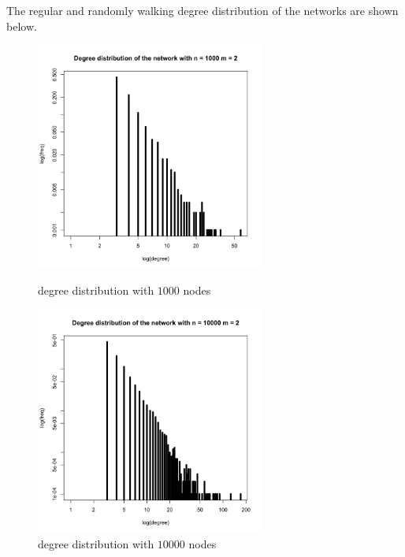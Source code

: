 \documentclass[draftcls,12pt,onecolumn]{IEEEtran}
\begin{document}
The regular and randomly walking degree distribution of the networks are shown below.
\begin{figure}[htbp]
\centering
\begin{minipage}[t]{0.48\textwidth}
\centering
\includegraphics[width=7.5cm]{img/2_g_1_degree1}
\caption{degree distribution with $1000$ nodes}
\end{minipage}
\begin{minipage}[t]{0.48\textwidth}
\centering
\includegraphics[width=7.5cm]{img/2_g_1_degree2}
\caption{degree distribution with $10000$ nodes}
\end{minipage}
\end{figure}
\end{document}
